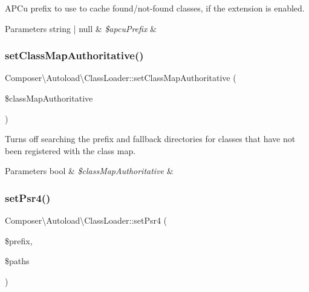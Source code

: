 A\+P\+Cu prefix to use to cache found/not-\/found classes, if the extension is enabled.


\begin{DoxyParams}[1]{Parameters}
string | null & {\em \$apcu\+Prefix} & \\
\hline
\end{DoxyParams}
\mbox{\label{classComposer_1_1Autoload_1_1ClassLoader_ab393ccb89c488ca52fe97865b0957196}} 
\subsubsection{\texorpdfstring{set\+Class\+Map\+Authoritative()}{setClassMapAuthoritative()}}
{\footnotesize\ttfamily Composer\textbackslash{}\+Autoload\textbackslash{}\+Class\+Loader\+::set\+Class\+Map\+Authoritative (\begin{DoxyParamCaption}\item[{}]{\$class\+Map\+Authoritative }\end{DoxyParamCaption})}

Turns off searching the prefix and fallback directories for classes that have not been registered with the class map.


\begin{DoxyParams}[1]{Parameters}
bool & {\em \$class\+Map\+Authoritative} & \\
\hline
\end{DoxyParams}
\mbox{\label{classComposer_1_1Autoload_1_1ClassLoader_a11d2831d7657855b5c07cb6885dd86ef}} 
\subsubsection{\texorpdfstring{set\+Psr4()}{setPsr4()}}
{\footnotesize\ttfamily Composer\textbackslash{}\+Autoload\textbackslash{}\+Class\+Loader\+::set\+Psr4 (\begin{DoxyParamCaption}\item[{}]{\$prefix,  }\item[{}]{\$paths }\end{DoxyParamCaption})}


